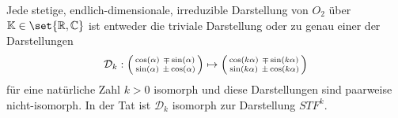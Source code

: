 \begin{theorem}
Jede stetige, endlich-dimensionale, irreduzible Darstellung von $O_2$ über $\IK\in\set{\IR,\IC}$ ist entweder die triviale Darstellung oder zu genau einer der Darstellungen
\[\mathcal{D}_k : \begin{psmallmatrix}\cos(\alpha)&\mp\sin(\alpha)\\\sin(\alpha)&\pm\cos(\alpha)\end{psmallmatrix} \mapsto \begin{psmallmatrix}\cos(k\alpha)&\mp\sin(k\alpha)\\\sin(k\alpha)&\pm\cos(k\alpha)\end{psmallmatrix}\]
für eine natürliche Zahl $k>0$ isomorph und diese Darstellungen sind paarweise nicht-isomorph. In der Tat ist $\mathcal{D}_k$ isomorph zur Darstellung $STF^k$.
\end{theorem}
